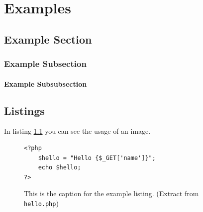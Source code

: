 \chapter{Examples}

\section{Example Section}

\subsection{Example Subsection}

\subsubsection{Example Subsubsection}

\section{Listings}
In listing \ref{example_listing} you can see the usage of an image.
\begin{figure}
\lstset{language=php}
\begin{lstlisting}
<?php
    $hello = "Hello {$_GET['name']}";
    echo $hello;
?>
\end{lstlisting}
\caption{This is the caption for the example listing. (Extract from \texttt{hello.php})}
\label{example_listing}
\end{figure}

